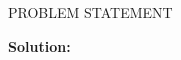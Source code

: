 \<PROBLEM STATEMENT\>

\begin{tcolorbox}
    \textbf{
        Solution: 
    } 
            

\end{tcolorbox}



